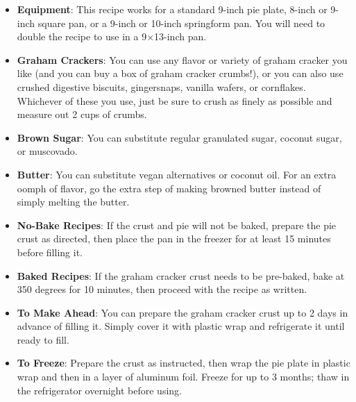 \notes
\begin{itemize}
    \item \textbf{Equipment}: This recipe works for a standard 9-inch pie plate,
    8-inch or 9-inch square pan, or a 9-inch or 10-inch springform pan. You will
    need to double the recipe to use in a 9×13-inch pan.

    \item \textbf{Graham Crackers}: You can use any flavor or variety of graham
    cracker you like (and you can buy a box of graham cracker crumbs!), or you
    can also use crushed digestive biscuits, gingersnaps, vanilla wafers, or
    cornflakes. Whichever of these you use, just be sure to crush as finely as
    possible and measure out 2 cups of crumbs.

    \item \textbf{Brown Sugar}: You can substitute regular granulated sugar,
    coconut sugar, or muscovado.

    \item \textbf{Butter}: You can substitute vegan alternatives or coconut oil.
    For an extra oomph of flavor, go the extra step of making browned butter
    instead of simply melting the butter.

    \item \textbf{No-Bake Recipes}: If the crust and pie will not be baked,
    prepare the pie crust as directed, then place the pan in the freezer for at
    least 15 minutes before filling it.

    \item \textbf{Baked Recipes}: If the graham cracker crust needs to be
    pre-baked, bake at 350 degrees for 10 minutes, then proceed with the recipe
    as written.

    \item \textbf{To Make Ahead}: You can prepare the graham cracker crust up to
    2 days in advance of filling it. Simply cover it with plastic wrap and
    refrigerate it until ready to fill.

    \item \textbf{To Freeze}: Prepare the crust as instructed, then wrap the pie
    plate in plastic wrap and then in a layer of aluminum foil. Freeze for up to
    3 months; thaw in the refrigerator overnight before using.

\end{itemize}